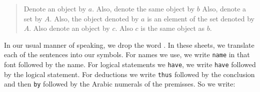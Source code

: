 \begin{quote}
Denote an object by $a$.
Also, denote the same object by $b$
Also, denote a set by $A$.
Also, the object denoted by $a$ is an element of the set denoted by $A$.
Also denote an object by $c$.
Also $c$ is the same object as $b$.
\end{quote}

In our usual manner of speaking, we drop the word .
In these sheets, we translate each of the sentences into our symbols.
For names we use, we write \texttt{name} in that font followed by the name.
For logical statements we \texttt{have}, we write \texttt{have} followed by the logical statement.
For deductions we write \texttt{thus} followed by the conclusion and then \texttt{by} followed by the Arabic numerals of the premisses.
So we write:

\begin{account}
\end{account}




